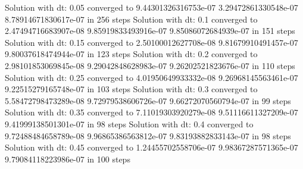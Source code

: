  Solution with dt: 0.05 converged to 9.44301326316753e-07  3.29472861330548e-07  8.78914671830617e-07 in 256 steps
 Solution with dt: 0.1 converged to 2.47494716683907e-08  9.85919833493916e-07  9.85086072684939e-07 in 151 steps
 Solution with dt: 0.15 converged to 2.50100012627708e-08  9.81679910491457e-07  9.80037618474944e-07 in 123 steps
 Solution with dt: 0.2 converged to 2.98101853069845e-08  9.29042848628983e-07  9.26202521823676e-07 in 110 steps
 Solution with dt: 0.25 converged to 4.01950649933332e-08  9.26968145563461e-07  9.22515279165748e-07 in 103 steps
 Solution with dt: 0.3 converged to 5.58472798473289e-08  9.72979538606726e-07  9.66272070560794e-07 in 99 steps
 Solution with dt: 0.35 converged to 7.11019303920279e-08  9.51116611327209e-07  9.41999138501301e-07 in 98 steps
 Solution with dt: 0.4 converged to 9.72488484658789e-08  9.96865386563812e-07  9.83193882833143e-07 in 98 steps
 Solution with dt: 0.45 converged to 1.24455702558706e-07  9.98367287571365e-07  9.79084118223986e-07 in 100 steps


